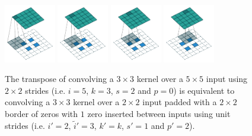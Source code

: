 \documentclass{article}
\begin{document}
\begin{figure}[t]
    \centering
    \includegraphics[width=0.2\textwidth]
        {pdf/no_padding_strides_transposed_00.pdf}
    \includegraphics[width=0.2\textwidth]
        {pdf/no_padding_strides_transposed_01.pdf}
    \includegraphics[width=0.2\textwidth]
        {pdf/no_padding_strides_transposed_02.pdf}
    \includegraphics[width=0.2\textwidth]
        {pdf/no_padding_strides_transposed_03.pdf}
    \caption{\label{fig:no_padding_strides_transposed} The transpose of
        convolving a $3 \times 3$ kernel over a $5 \times 5$ input using $2
        \times 2$ strides (i.e. $i = 5$, $k = 3$, $s = 2$ and $p = 0$) is
        equivalent to convolving a $3 \times 3$ kernel over a $2 \times 2$ input
        padded with a $2 \times 2$ border of zeros with $1$ zero inserted
        between inputs using unit strides (i.e. $i' = 2$, $\tilde{i}' = 3$, $k'
        = k$, $s' = 1$ and $p' = 2$).}
\end{figure}
\end{document}
